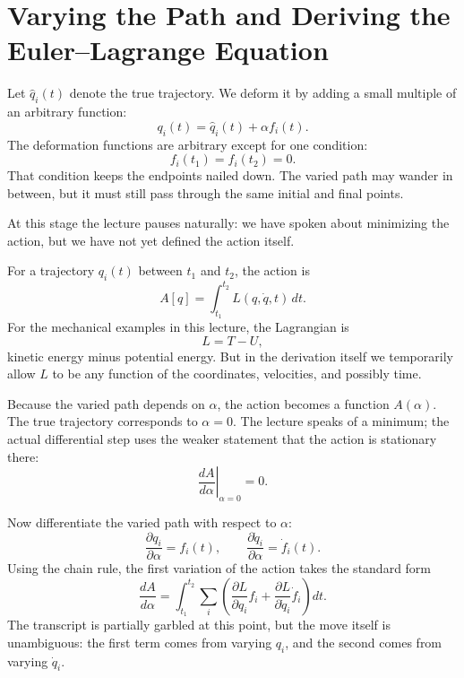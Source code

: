 \section{Varying the Path and Deriving the Euler--Lagrange Equation}

Let \(\hat q_i(t)\) denote the true trajectory. We deform it by adding a small multiple of an arbitrary function:
\begin{equation}
q_i(t)=\hat q_i(t)+\alpha f_i(t).
\end{equation}
The deformation functions are arbitrary except for one condition:
\begin{equation}
f_i(t_1)=f_i(t_2)=0.
\end{equation}
That condition keeps the endpoints nailed down. The varied path may wander in between, but it must still pass through the same initial and final points.

At this stage the lecture pauses naturally: we have spoken about minimizing the action, but we have not yet defined the action itself.

\begin{definition}
For a trajectory \(q_i(t)\) between \(t_1\) and \(t_2\), the action is
\begin{equation}
A[q]=\int_{t_1}^{t_2}L(q,\dot q,t)\,dt.
\end{equation}
For the mechanical examples in this lecture, the Lagrangian is
\begin{equation}
L=T-U,
\end{equation}
kinetic energy minus potential energy. But in the derivation itself we temporarily allow \(L\) to be any function of the coordinates, velocities, and possibly time.
\end{definition}

Because the varied path depends on \(\alpha\), the action becomes a function \(A(\alpha)\). The true trajectory corresponds to \(\alpha=0\). The lecture speaks of a minimum; the actual differential step uses the weaker statement that the action is stationary there:
\begin{equation}
\left.\frac{dA}{d\alpha}\right|_{\alpha=0}=0.
\end{equation}

Now differentiate the varied path with respect to \(\alpha\):
\begin{equation}
\frac{\partial q_i}{\partial \alpha}=f_i(t), \qquad
\frac{\partial \dot q_i}{\partial \alpha}=\dot f_i(t).
\end{equation}
Using the chain rule, the first variation of the action takes the standard form
\begin{equation}
\frac{dA}{d\alpha}
=
\int_{t_1}^{t_2}
\sum_i
\left(
\frac{\partial L}{\partial q_i}f_i
+
\frac{\partial L}{\partial \dot q_i}\dot f_i
\right)dt.
\end{equation}
The transcript is partially garbled at this point, but the move itself is unambiguous: the first term comes from varying \(q_i\), and the second comes from varying \(\dot q_i\).

